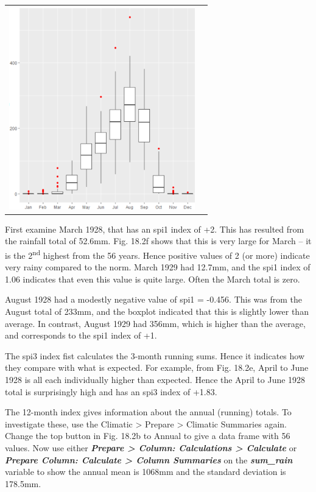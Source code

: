 \documentclass[
  letterpaper,
  DIV=11,
  numbers=noendperiod]{scrreprt}
\begin{document}
\begin{longtable}[]{@{}
  >{\raggedright\arraybackslash}p{}
  >{\centering\arraybackslash}p{}@{}}
\includegraphics[width=3.17556in,height=\textheight]{figures/Fig18.2f.png} \\
\end{longtable}

First examine March 1928, that has an spi1 index of +2. This has
resulted from the rainfall total of 52.6mm. Fig. 18.2f shows that this
is very large for March -- it is the 2\textsuperscript{nd} highest from
the 56 years. Hence positive values of 2 (or more) indicate very rainy
compared to the norm. March 1929 had 12.7mm, and the spi1 index of 1.06
indicates that even this value is quite large. Often the March total is
zero.

August 1928 had a modestly negative value of spi1 = -0.456. This was
from the August total of 233mm, and the boxplot indicated that this is
slightly lower than average. In contrast, August 1929 had 356mm, which
is higher than the average, and corresponds to the spi1 index of +1.

The spi3 index fist calculates the 3-month running sums. Hence it
indicates how they compare with what is expected. For example, from Fig.
18.2e, April to June 1928 is all each individually higher than expected.
Hence the April to June 1928 total is surprisingly high and has an spi3
index of +1.83.

The 12-month index gives information about the annual (running) totals.
To investigate these, use the Climatic \textgreater{} Prepare
\textgreater{} Climatic Summaries again. Change the top button in Fig.
18.2b to Annual to give a data frame with 56 values. Now use either
\textbf{\emph{Prepare \textgreater{} Column: Calculations \textgreater{}
Calculate}} or \textbf{\emph{Prepare Column: Calculate \textgreater{}
Column Summaries}} on the \textbf{\emph{sum\_rain}} variable to show the
annual mean is 1068mm and the standard deviation is 178.5mm.
\end{document}
